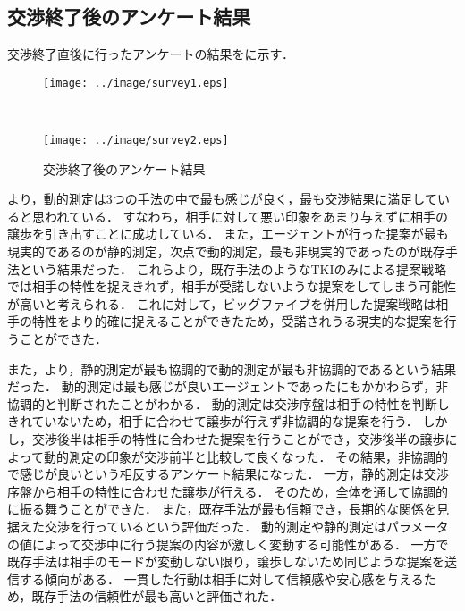 \clearpage

\subsection{交渉終了後のアンケート結果}
交渉終了直後に行ったアンケートの結果をに示す．
\begin{figure}[!bt]
    \begin{minipage}[b]{0.95\linewidth}
        \centering
        \texttt{[image: ../image/survey1.eps]}
        \label{fig:survey1}
    \end{minipage}\\
    \begin{center}
        \begin{minipage}[b]{0.95\linewidth}
            \centering
            \texttt{[image: ../image/survey2.eps]}
            \label{fig:survey2}
        \end{minipage}
    \end{center}
    \caption{交渉終了後のアンケート結果}\label{fig:survey}
\end{figure}
より，動的測定は3つの手法の中で最も感じが良く，最も交渉結果に満足していると思われている．
すなわち，相手に対して悪い印象をあまり与えずに相手の譲歩を引き出すことに成功している．
また，エージェントが行った提案が最も現実的であるのが静的測定，次点で動的測定，最も非現実的であったのが既存手法という結果だった．
これらより，既存手法のようなTKIのみによる提案戦略では相手の特性を捉えきれず，相手が受諾しないような提案をしてしまう可能性が高いと考えられる．
これに対して，ビッグファイブを併用した提案戦略は相手の特性をより的確に捉えることができたため，受諾されうる現実的な提案を行うことができた．

また，より，静的測定が最も協調的で動的測定が最も非協調的であるという結果だった．
動的測定は最も感じが良いエージェントであったにもかかわらず，非協調的と判断されたことがわかる．
動的測定は交渉序盤は相手の特性を判断しきれていないため，相手に合わせて譲歩が行えず非協調的な提案を行う．
しかし，交渉後半は相手の特性に合わせた提案を行うことができ，交渉後半の譲歩によって動的測定の印象が交渉前半と比較して良くなった．
その結果，非協調的で感じが良いという相反するアンケート結果になった．
一方，静的測定は交渉序盤から相手の特性に合わせた譲歩が行える．
そのため，全体を通して協調的に振る舞うことができた．
また，既存手法が最も信頼でき，長期的な関係を見据えた交渉を行っているという評価だった．
動的測定や静的測定はパラメータの値によって交渉中に行う提案の内容が激しく変動する可能性がある．
一方で既存手法は相手のモードが変動しない限り，譲歩しないため同じような提案を送信する傾向がある．
一貫した行動は相手に対して信頼感や安心感を与えるため，既存手法の信頼性が最も高いと評価された．

